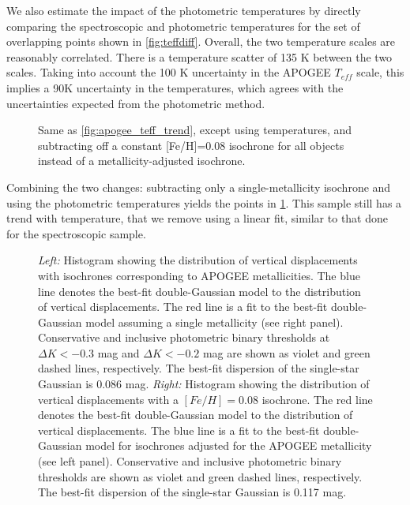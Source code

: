 \documentclass[manuscript]{aastex6}
\newcommand{\Teff}{\ensuremath{T_{eff}}}
\begin{document}
We also estimate the impact of the photometric temperatures by directly 
comparing the spectroscopic and photometric temperatures for the set of 
overlapping points shown in \cref{fig:teffdiff}. Overall, the two temperature scales are reasonably
correlated. There is a temperature scatter of 135 K between the two scales.
Taking into account the 100 K uncertainty in the APOGEE \Teff{} scale, this
implies a 90K uncertainty in the \citet{Pinsonneault12} temperatures, which
agrees with the uncertainties expected from the photometric method. 

\begin{figure}[htb]
    \centering
    \caption{Same as \cref{fig:apogee_teff_trend}, except using
        \citet{Pinsonneault12} temperatures, and subtracting off a
    constant [Fe/H]=0.08 isochrone for all objects instead of a 
    metallicity-adjusted isochrone.}\label{fig:photuncor}
\end{figure}

Combining the two changes: subtracting only a single-metallicity isochrone and
using the photometric temperatures yields the points in \cref{fig:photuncor}.
This sample still has a trend with temperature, that we remove using a linear
fit, similar to that done for the spectroscopic sample.

\begin{figure*}[htb]
    \centering
    \caption{\emph{Left:} Histogram showing the distribution of vertical 
        displacements with isochrones corresponding to APOGEE metallicities.
        The blue line denotes the best-fit double-Gaussian model to the
        distribution of vertical displacements. The red line is a fit to the
        best-fit double-Gaussian model assuming a single metallicity (see right
        panel). Conservative and inclusive photometric binary thresholds at 
        \(\Delta K < -0.3\) mag and \(\Delta K < -0.2\) mag are shown as violet and green dashed 
        lines, respectively. The best-fit dispersion of the single-star 
        Gaussian is 0.086 mag. \emph{Right:} Histogram showing the 
        distribution of vertical displacements with a \([Fe/H] = 0.08\) 
        isochrone. The red line denotes the best-fit double-Gaussian model to
        the distribution of vertical displacements. The blue line is a fit to
        the best-fit double-Gaussian model for isochrones adjusted for the
        APOGEE metallicity (see left panel). Conservative and inclusive
        photometric binary thresholds are shown as violet and green dashed 
        lines, respectively. The best-fit dispersion of the single-star 
        Gaussian is 0.117 mag.}\label{fig:histcompare}
\end{figure*}
\end{document}

